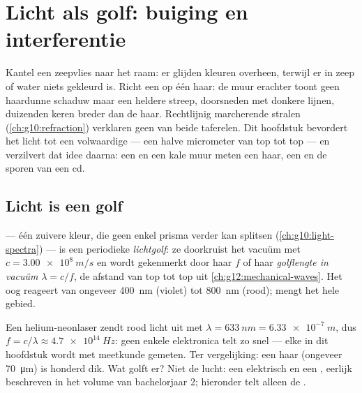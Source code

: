 \chapter{Licht als golf: buiging en interferentie}\label{ch:g12:light-as-wave}

Kantel een zeepvlies naar het raam: er glijden kleuren overheen, terwijl
er in zeep of water niets gekleurd is. Richt een  op één haar: de
muur erachter toont geen haardunne schaduw maar een heldere streep,
doorsneden met donkere lijnen, duizenden keren breder dan de haar.
Rechtlijnig marcherende stralen (\cref{ch:g10:refraction}) verklaren geen
van beide taferelen. Dit hoofdstuk bevordert het licht tot een volwaardige
 --- een halve micrometer van top tot top --- en verzilvert dat idee
daarna: een  en een kale muur meten een haar, een  en de
sporen van een cd.

\section{Licht is een golf}

\begin{definition}[Lichtgolven]\label{def:g12:light-as-wave:lightwave}
 --- één zuivere kleur, die geen enkel prisma verder
kan splitsen (\cref{ch:g10:light-spectra}) --- is een periodieke
\emph{lichtgolf}: ze doorkruist het vacuüm met
$c = \qty{3.00e8}{m/s}$ en wordt gekenmerkt door haar  $f$ of
haar \emph{golflengte in vacuüm}
$\lambda = c/f$, de afstand van top tot top uit
\cref{ch:g12:mechanical-waves}. Het oog reageert van ongeveer
\qty{400}{nm} (violet) tot \qty{800}{nm} (rood);  mengt het hele
gebied.
\end{definition}

\begin{example}[Ordegrootten]\label{ex:g12:light-as-wave:orders}
Een helium-neonlaser zendt rood licht uit met
$\lambda = \qty{633}{nm} = \qty{6.33e-7}{m}$, dus
$f = c/\lambda \approx \qty{4.7e14}{Hz}$: geen enkele elektronica telt zo
snel --- elke  in dit hoofdstuk wordt met meetkunde gemeten.
Ter vergelijking: een haar (ongeveer \qty{70}{\micro m}) is honderd
 dik. Wat golft er? Niet de lucht: een elektrisch en een
, eerlijk beschreven in het volume van bachelorjaar 2;
hieronder telt alleen de .
\end{example}

